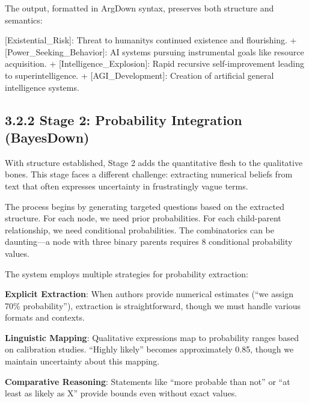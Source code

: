 \documentclass[
  11pt,
  letterpaper,
  openany]{book}
\newenvironment{Shaded}{\begin{snugshade}}{\end{snugshade}}
\newcommand{\CommentTok}[1]{\textcolor[rgb]{0.37,0.37,0.37}{#1}}
\newcommand{\NormalTok}[1]{\textcolor[rgb]{0.00,0.23,0.31}{#1}}
\newcommand{\OtherTok}[1]{\textcolor[rgb]{0.00,0.23,0.31}{#1}}
\newcommand{\SpecialStringTok}[1]{\textcolor[rgb]{0.13,0.47,0.30}{#1}}
\begin{document}
The output, formatted in ArgDown syntax, preserves both structure and
semantics:

\begin{Shaded}
\begin{Highlighting}[]
\OtherTok{[Existential\_Risk]: }\NormalTok{Threat to humanity\textquotesingle{}s continued existence and flourishing.}
\SpecialStringTok{ + }\CommentTok{[}\OtherTok{Power\_Seeking\_Behavior}\CommentTok{]}\NormalTok{: AI systems pursuing instrumental goals like resource acquisition.}
\SpecialStringTok{   + }\CommentTok{[}\OtherTok{Intelligence\_Explosion}\CommentTok{]}\NormalTok{: Rapid recursive self{-}improvement leading to superintelligence.}
\SpecialStringTok{     + }\CommentTok{[}\OtherTok{AGI\_Development}\CommentTok{]}\NormalTok{: Creation of artificial general intelligence systems.}
\end{Highlighting}
\end{Shaded}

\subsection{3.2.2 Stage 2: Probability Integration
(BayesDown)}\label{sec-stage2-bayesdown}

With structure established, Stage 2 adds the quantitative flesh to the
qualitative bones. This stage faces a different challenge: extracting
numerical beliefs from text that often expresses uncertainty in
frustratingly vague terms.

The process begins by generating targeted questions based on the
extracted structure. For each node, we need prior probabilities. For
each child-parent relationship, we need conditional probabilities. The
combinatorics can be daunting---a node with three binary parents
requires 8 conditional probability values.

The system employs multiple strategies for probability extraction:

\textbf{Explicit Extraction}: When authors provide numerical estimates
(``we assign 70\% probability''), extraction is straightforward, though
we must handle various formats and contexts.

\textbf{Linguistic Mapping}: Qualitative expressions map to probability
ranges based on calibration studies. ``Highly likely'' becomes
approximately 0.85, though we maintain uncertainty about this mapping.

\textbf{Comparative Reasoning}: Statements like ``more probable than
not'' or ``at least as likely as X'' provide bounds even without exact
values.
\end{document}
